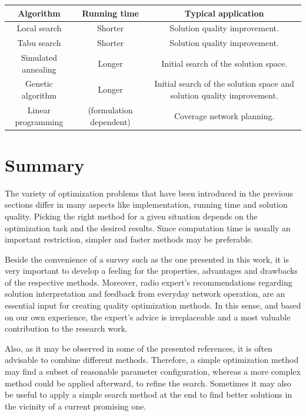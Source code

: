 \begin{table}

{\footnotesize }%
\begin{tabular}{|c|c|c|}
\hline 
{\footnotesize Algorithm} & {\footnotesize Running time} & {\footnotesize Typical application}\tabularnewline
\hline 
\hline 
{\footnotesize Local search} & {\footnotesize Shorter} & {\footnotesize Solution quality improvement.}\tabularnewline
\hline 
{\footnotesize Tabu search} & {\footnotesize Shorter} & {\footnotesize Solution quality improvement.}\tabularnewline
\hline 
{\footnotesize Simulated annealing} & {\footnotesize Longer} & {\footnotesize Initial search of the solution space.}\tabularnewline
\hline 
{\footnotesize Genetic algorithm} & {\footnotesize Longer} & {\footnotesize Initial search of the solution space and solution quality
improvement.}\tabularnewline
\hline 
{\footnotesize Linear programming} & {\footnotesize (formulation dependent)} & {\footnotesize Coverage network planning.}\tabularnewline
\hline 
\end{tabular}
\end{table}



\section*{Summary}

The variety of optimization problems that have been introduced in
the previous sections differ in many aspects like implementation,
running time and solution quality. Picking the right method for a
given situation depends on the optimization task and the desired results.
Since computation time is usually an important restriction, simpler
and faster methods may be preferable. 

Beside the convenience of a survey such as the one presented in this
work, it is very important to develop a feeling for the properties,
advantages and drawbacks of the respective methods. Moreover, radio
expert's recommendations regarding solution interpretation and feedback
from everyday network operation, are an essential input for creating
quality optimization methods. In this sense, and based on our own
experience, the expert's advice is irreplaceable and a most valuable
contribution to the research work.

Also, as it may be observed in some of the presented references, it
is often advisable to combine different methods. Therefore, a simple
optimization method may find a subset of reasonable parameter configuration,
whereas a more complex method could be applied afterward, to refine
the search. Sometimes it may also be useful to apply a simple search
method at the end to find better solutions in the vicinity of a current
promising one.
